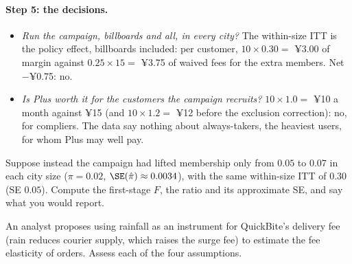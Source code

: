 \documentclass[11pt]{article}
\begin{document}
\paragraph{Step 5: the decisions.}
\begin{itemize}
  \item \emph{Run the campaign, billboards and all, in every city?} The within-size ITT is the policy effect, billboards
  included: per customer, $10 \times 0.30 = $ ¥3.00 of margin against $0.25 \times 15 = $ ¥3.75 of waived fees for the extra
  members. Net $-$¥0.75: no.
  \item \emph{Is Plus worth it for the customers the campaign recruits?} $10 \times 1.0 = $ ¥10 a month against ¥15 (and
  $10 \times 1.2 = $ ¥12 before the exclusion correction): no, for compliers. The data say nothing about always-takers, the
  heaviest users, for whom Plus may well pay.
\end{itemize}

\begin{exercise}[computation]
Suppose instead the campaign had lifted membership only from $0.05$ to $0.07$ in each city size ($\pi = 0.02$, $\SE(\hat\pi) \approx 0.0034$),
with the same within-size ITT of $0.30$ (SE $0.05$). Compute the first-stage $F$, the ratio and its approximate SE, and say what you would
report.
\end{exercise}

\begin{exercise}[judgement]
An analyst proposes using rainfall as an instrument for QuickBite's delivery fee (rain reduces courier supply, which raises the
surge fee) to estimate the fee elasticity of orders. Assess each of the four assumptions.
\end{exercise}
\end{document}
